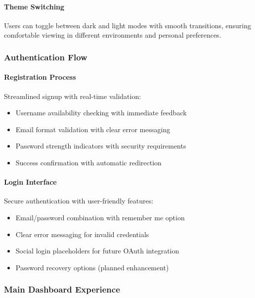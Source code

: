 \documentclass[12pt,a4paper]{article}
\begin{document}
    \paragraph{Theme Switching}
    Users can toggle between dark and light modes with smooth transitions, ensuring comfortable viewing in different environments and personal preferences.

    \subsubsection{Authentication Flow}

    \paragraph{Registration Process}
    Streamlined signup with real-time validation:
    \begin{itemize}[leftmargin=0.5in]
        \item Username availability checking with immediate feedback
        \item Email format validation with clear error messaging
        \item Password strength indicators with security requirements
        \item Success confirmation with automatic redirection
    \end{itemize}

    \paragraph{Login Interface}
    Secure authentication with user-friendly features:
    \begin{itemize}[leftmargin=0.5in]
        \item Email/password combination with remember me option
        \item Clear error messaging for invalid credentials
        \item Social login placeholders for future OAuth integration
        \item Password recovery options (planned enhancement)
    \end{itemize}

    \subsubsection{Main Dashboard Experience}
\end{document}
